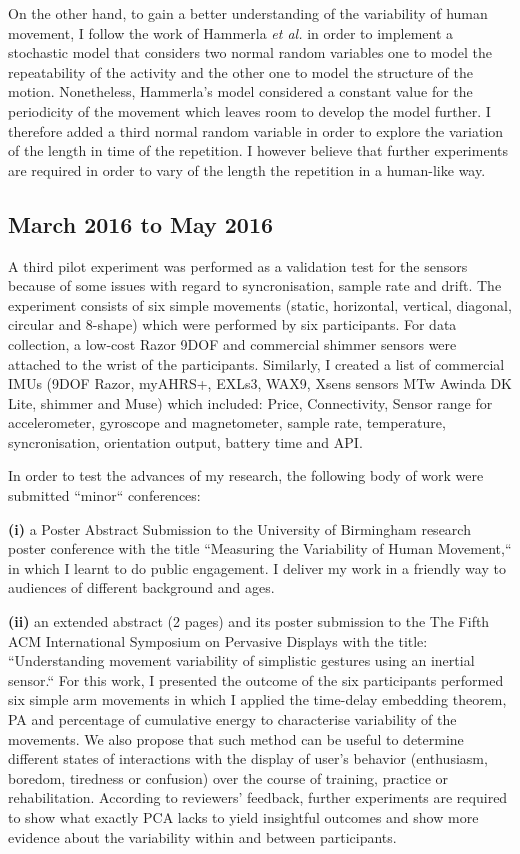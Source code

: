 \documentclass[9pt,journal,onecolumn,compsoc]{IEEEtran}
\begin{document}
On the other hand, to gain a better understanding of the variability of human movement,
I follow the work of Hammerla  \textit{et al.} \cite{Hammerla2011} in order to implement a stochastic model 
that considers two normal random variables one to model the repeatability of the activity 
and the other one to model the structure of the motion.
Nonetheless, Hammerla's model considered a constant value for the periodicity of the movement 
which leaves room to develop the model further.
I therefore added a third normal random variable 
in order to explore the variation of the length in time of the repetition.
I however believe that further experiments 
are required in order to vary of the length the repetition in a human-like way.




\subsection{March 2016 to May 2016}

A third pilot experiment was performed as a validation test
for the sensors because of some issues with regard to syncronisation, sample rate and drift.
The experiment consists of six simple movements 
(static, horizontal, vertical, diagonal, circular and 8-shape)
which were performed by six participants. 
For data collection,
a low-cost Razor 9DOF
and commercial shimmer sensors were attached to the wrist of the participants.
Similarly, I created a list of commercial IMUs
(9DOF Razor, myAHRS+, EXLs3, WAX9, Xsens sensors MTw Awinda DK Lite, shimmer and Muse)
which included:
Price, Connectivity, Sensor range for accelerometer, gyroscope and magnetometer, 
sample rate, temperature, syncronisation, orientation output, battery time and API.


In order to test the advances of my research, the following body of work were submitted ``minor`` conferences:

\textbf{(i)} a Poster Abstract Submission to the University of Birmingham research poster conference
with the title ``Measuring the Variability of Human Movement,``
in which I learnt to do public engagement. I deliver my work in a friendly way to audiences of 
different background and ages.

\textbf{(ii)} an extended abstract (2 pages) and its poster submission to the The Fifth ACM International 
Symposium on Pervasive Displays with the title: 
``Understanding movement variability of simplistic gestures using an inertial sensor.``
For this work, I presented the outcome of the six participants performed six simple arm movements
in which I applied the time-delay embedding theorem, PA and percentage of cumulative energy 
to characterise variability of the movements. 
We also propose that such method can be useful
to determine different states of interactions with the display of user’s behavior 
(enthusiasm, boredom, tiredness or confusion) over the course of training, practice or rehabilitation.
According to reviewers' feedback, 
further experiments are required to show what exactly PCA lacks to yield insightful outcomes
and show more evidence about the variability within and between participants.
\end{document}

